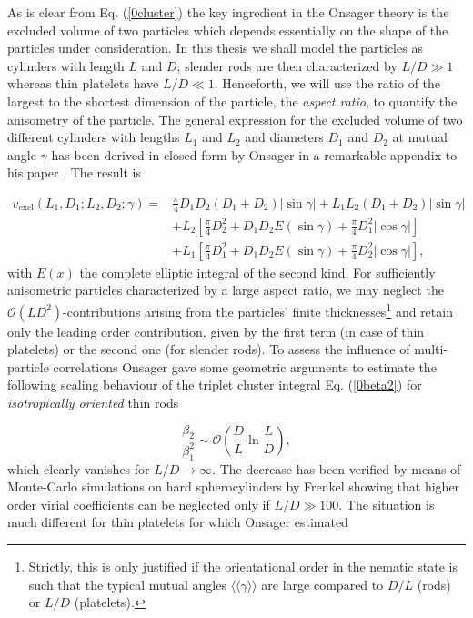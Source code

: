 {As is clear from Eq. (\ref{0cluster}) the key ingredient in the Onsager theory is the excluded volume of two particles which depends essentially on the shape of the particles under consideration. In this thesis we shall model the particles as cylinders with length $L$ and $D$; slender rods are then characterized by  $L/D\gg 1$ whereas thin platelets have $L/D\ll 1$. Henceforth, we will use the ratio of the largest to the shortest dimension of the particle, the {\em aspect ratio}, to quantify the anisometry of the particle. The general expression for the excluded volume of two different cylinders with lengths $L_{1}$ and $L_{2}$ and diameters $D_{1}$ and $D_{2}$ at mutual angle $\gamma$ has been derived in closed form by Onsager in a remarkable appendix to his paper \cite{onsager1949}. The result is

\begin{align}
v_{\text{excl}}(L_{1},D_{1};L_{2},D_{2};\gamma)=& \frac{\pi}{4}D_{1}D_{2}(D_{1}+D_{2})\left|\sin\gamma\right| +L_{1}L_{2}(D_{1}+D_{2})
\left|\sin\gamma\right| \nonumber  \\
&+L_{2}\left[\frac{\pi}{4}D_{2}^{2}+D_{1}D_{2}E(\sin\gamma)+\frac{\pi}{4}D_{1}^{2} \left|\cos\gamma \right| \right] \nonumber \\
&+L_{1}\left[\frac{\pi}{4}D_{1}^{2}+D_{1}D_{2}E(\sin\gamma)+\frac{\pi}{4}D_{2}^{2} \left|\cos\gamma \right| \right],
\label{0evonsager}
\end{align}
with $E(x)$ the complete elliptic integral of the second kind. For sufficiently anisometric particles characterized by a  large aspect ratio, we may neglect the $\mathcal{O}(LD^{2})$-contributions arising from the particles' finite thicknesses\footnote{Strictly,
this is only justified if the orientational order in the nematic state is such that the  typical mutual angles $ \langle\langle\gamma \rangle\rangle $ are large compared
to $D/L$ (rods) or $L/D$ (platelets).} and  retain only the leading order contribution, given by the first term (in case of thin platelets) or the second one (for slender rods). To assess the influence of  multi-particle correlations Onsager gave some geometric arguments to estimate the following scaling behaviour of the triplet cluster integral Eq. (\ref{0beta2}) for {\em isotropically oriented} thin rods

\begin{equation}
\frac{\beta_{2}}{\beta_{1}^{2}}\sim \mathcal{O}\left(\frac{D}{L}\ln\frac{L}{D}\right),
\end{equation}
which clearly vanishes for $L/D \rightarrow \infty $. The decrease  has been  verified by means of Monte-Carlo simulations on hard spherocylinders by Frenkel \cite{Frenkel87,Frenkel87err} showing that higher order virial coefficients can be neglected only if $L/D\gg 100$. The situation is much different for thin platelets for which Onsager estimated

}
